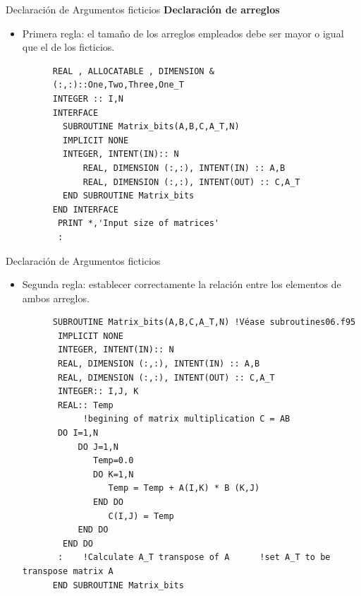 \begin{frame}[fragile]{Declaración de Argumentos ficticios}
\textbf{Declaración de arreglos}
 \begin{itemize}[<+(1)->]
  \item Primera regla: el tamaño de los arreglos empleados debe ser mayor o igual que el de los ficticios.  
   \vspace{0.15cm}
      \begin{verbatim}
      REAL , ALLOCATABLE , DIMENSION &
      (:,:)::One,Two,Three,One_T
      INTEGER :: I,N
      INTERFACE
        SUBROUTINE Matrix_bits(A,B,C,A_T,N)
        IMPLICIT NONE
        INTEGER, INTENT(IN):: N
            REAL, DIMENSION (:,:), INTENT(IN) :: A,B
            REAL, DIMENSION (:,:), INTENT(OUT) :: C,A_T
        END SUBROUTINE Matrix_bits
      END INTERFACE
       PRINT *,'Input size of matrices'
       :
      \end{verbatim} 
 \end{itemize}
\end{frame}

\begin{frame}[fragile]{Declaración de Argumentos ficticios}
 \begin{itemize}[<+(0)->]
 \item Segunda regla: establecer correctamente la relación entre los elementos de ambos arreglos.
  \vspace{0.15cm}
      \begin{verbatim}
      SUBROUTINE Matrix_bits(A,B,C,A_T,N) !Véase subroutines06.f95
       IMPLICIT NONE
       INTEGER, INTENT(IN):: N
       REAL, DIMENSION (:,:), INTENT(IN) :: A,B
       REAL, DIMENSION (:,:), INTENT(OUT) :: C,A_T
       INTEGER:: I,J, K
       REAL:: Temp
            !begining of matrix multiplication C = AB  
       DO I=1,N                         
           DO J=1,N
              Temp=0.0
              DO K=1,N
                 Temp = Temp + A(I,K) * B (K,J)
              END DO
                 C(I,J) = Temp
           END DO
        END DO
       :    !Calculate A_T transpose of A      !set A_T to be transpose matrix A
      END SUBROUTINE Matrix_bits
      \end{verbatim} 
 \end{itemize}
\end{frame} 

